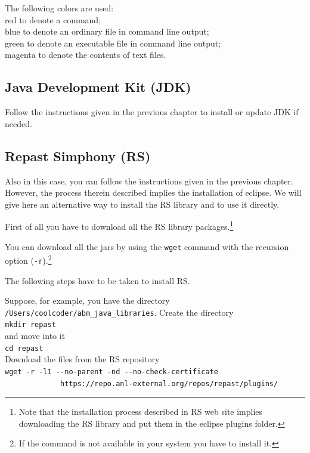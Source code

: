 \documentclass{book}
\begin{document}
The following colors are used:\\
\color{red}red \color{black} to denote a command;\\
\color{blue}blue \color{black} to denote an ordinary file in command line output;\\
\color{green}green \color{black} to denote an executable file in command line output;\\
\color{magenta}magenta \color{black} to denote the contents of text files.\\

\subsection{Java Development Kit (JDK)}
Follow the instructions given in the previous chapter to install or update JDK if needed. 
\subsection{Repast Simphony (RS)}
Also in this case, you can follow the instructions given in the previous chapter. However, the process therein described implies the installation of eclipse. We will give here an alternative way to install the RS library and to use it directly.

First of all you have to download all the RS library packages.\footnote{Note that the installation process described in RS web site implies downloading the RS library and put them in the eclipse plugins folder.}

You can download all the jars by using the \verb+wget+ command with the recursion option (\verb+-r+).\footnote{If the command is not available in your system you have to install it.}

The following steps have to be taken to install RS.

Suppose, for example, you have the directory \verb+/Users/coolcoder/abm_java_libraries+. Create the directory\\
\verb+mkdir repast+\\
and move into it\\
\verb+cd repast+\\

Download the files from the RS repository\\
\verb+wget -r -l1 --no-parent -nd --no-check-certificate +\\
\verb+             https://repo.anl-external.org/repos/repast/plugins/+\\
\end{document}
